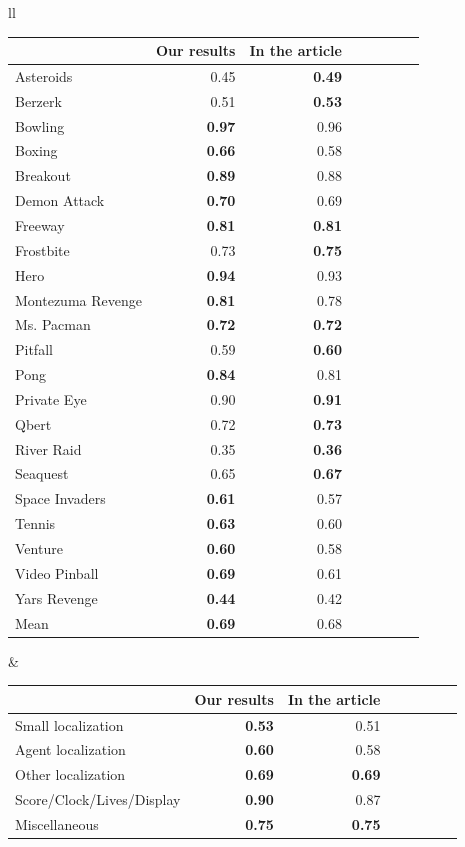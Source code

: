 \begin{table}[H]
\centering
\begin{tabular}{ll}
\begin{tabular}{lrrrrrrr}
\toprule
{} &  Our results & In the article \\
\midrule
Asteroids               &  0.45&  \textbf{0.49}\\
Berzerk               &  0.51&  \textbf{0.53}\\
Bowling               &  \textbf{0.97} &  0.96\\
Boxing               &  \textbf{0.66}&  0.58\\
Breakout               &  \textbf{0.89} &  0.88\\
Demon Attack               &  \textbf{0.70}&  0.69\\
Freeway               &  \textbf{0.81}&  \textbf{0.81}\\
Frostbite               &  0.73&  \textbf{0.75}\\
Hero               &  \textbf{0.94} &  0.93\\
Montezuma Revenge     &  \textbf{ 0.81}&  0.78\\
Ms. Pacman        &  \textbf{0.72}&  \textbf{0.72}\\
Pitfall              &  0.59&  \textbf{0.60}\\
Pong              &  \textbf{0.84}&  0.81\\
Private Eye              & 0.90 &  \textbf{0.91}\\
Qbert               &  0.72&  \textbf{0.73}\\
River Raid               &  0.35&  \textbf{0.36}\\
Seaquest               &  0.65&  \textbf{0.67}\\
Space Invaders        &  \textbf{0.61}&  0.57\\
Tennis               &  \textbf{0.63}&  0.60\\
Venture               &  \textbf{0.60}&  0.58\\
Video Pinball               &  \textbf{0.69}&  0.61\\
Yars Revenge               &  \textbf{0.44}&  0.42\\
\hline
Mean                &  \textbf{0.69}&  0.68\\
\bottomrule
\end{tabular}
&

\begin{tabular}{lrrrrrrr}
\toprule
{} &  Our results & In the article\\
\midrule
Small localization             &  \textbf{0.53}&  0.51\\
Agent localization        &  \textbf{0.60}&  0.58\\
Other localization      &  \textbf{0.69}&  \textbf{0.69}\\
Score/Clock/Lives/Display       &  \textbf{0.90}&  0.87\\
Miscellaneous       &  \textbf{0.75}&  \textbf{0.75}\\
\bottomrule
\end{tabular}


\end{tabular}
\end{table}
